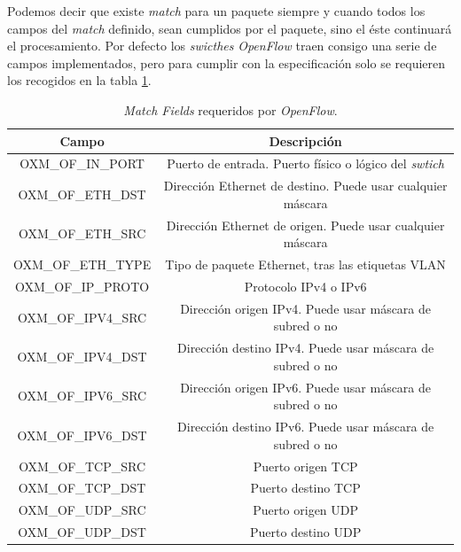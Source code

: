 \documentclass[a4paper,11pt]{book}
\begin{document}
\begin{itemize}
Podemos decir que existe \textit{match} para un paquete siempre y cuando todos los campos del \textit{match} definido, sean cumplidos por el paquete, sino el éste continuará el procesamiento. Por defecto los \textit{swicthes} \emph{OpenFlow} traen consigo una serie de campos implementados, pero para cumplir con la especificación solo se requieren los recogidos en la tabla \ref{matchFields}.

\begin{table}[tb]
\centering
\begin{tabular}{|c|c|}
\hline
\textbf{Campo}     & \textbf{Descripción}                                                 \\ \hline
OXM\_OF\_IN\_PORT  & Puerto de entrada. Puerto físico o lógico del \textit{swtich} \\ \hline
OXM\_OF\_ETH\_DST  & Dirección Ethernet de destino. Puede usar cualquier máscara            \\ \hline
OXM\_OF\_ETH\_SRC  & Dirección Ethernet de origen. Puede usar cualquier máscara                   \\ \hline
OXM\_OF\_ETH\_TYPE & Tipo de paquete Ethernet, tras las etiquetas VLAN       \\ \hline
OXM\_OF\_IP\_PROTO & Protocolo \ac{IP}v4 o \ac{IP}v6                                         \\ \hline
OXM\_OF\_IPV4\_SRC & Dirección origen \ac{IP}v4. Puede usar máscara de subred o no        \\ \hline
OXM\_OF\_IPV4\_DST & Dirección destino \ac{IP}v4. Puede usar máscara de subred o no   \\ \hline
OXM\_OF\_IPV6\_SRC & Dirección origen \ac{IP}v6. Puede usar máscara de subred o no        \\ \hline
OXM\_OF\_IPV6\_DST & Dirección destino \ac{IP}v6. Puede usar máscara de subred o no   \\ \hline
OXM\_OF\_TCP\_SRC  & Puerto origen \ac{TCP}                                                   \\ \hline
OXM\_OF\_TCP\_DST  & Puerto destino \ac{TCP}                                                \\ \hline
OXM\_OF\_UDP\_SRC  & Puerto origen \ac{UDP}                                                        \\ \hline
OXM\_OF\_UDP\_DST  & Puerto destino \ac{UDP}                                                   \\ \hline
\end{tabular}
\caption{\textit{Match Fields} requeridos por \emph{OpenFlow}.}\label{matchFields}
\end{table}


\end{itemize}
\end{document}

